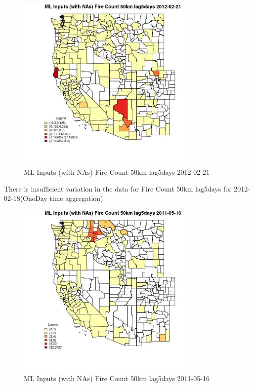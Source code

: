 \begin{figure} 
\centering  
\includegraphics[width=0.77\textwidth]{Code_Outputs/Report_ML_input_PM25_Step4_part_f_de_duplicated_aves_prioritize_24hr_obswNAs_CountyFire_Count_50km_lag5daysMean2012-02-21.jpg} 
\caption{\label{fig:Report_ML_input_PM25_Step4_part_f_de_duplicated_aves_prioritize_24hr_obswNAsCountyFire_Count_50km_lag5daysMean2012-02-21}ML Inputs (with NAs) Fire Count 50km lag5days 2012-02-21} 
\end{figure} 
 

There is insufficient variation in the data for Fire Count 50km lag5days for 2012-02-18(OneDay time aggregation). 
 

\begin{figure} 
\centering  
\includegraphics[width=0.77\textwidth]{Code_Outputs/Report_ML_input_PM25_Step4_part_f_de_duplicated_aves_prioritize_24hr_obswNAs_CountyFire_Count_50km_lag5daysMean2011-05-16.jpg} 
\caption{\label{fig:Report_ML_input_PM25_Step4_part_f_de_duplicated_aves_prioritize_24hr_obswNAsCountyFire_Count_50km_lag5daysMean2011-05-16}ML Inputs (with NAs) Fire Count 50km lag5days 2011-05-16} 
\end{figure} 
 

